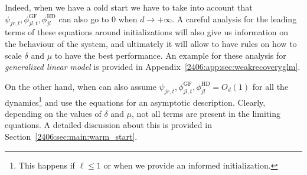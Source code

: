 Indeed, when we have a cold start we have to take into account that \(\psi_{jr,t}, \phi_{jl,t}^\text{GF}, \phi^\text{HD}_{jl}\) can also go to 0 when \(d\to+\infty\). A careful analysis for the leading terms of these equations around initializations will also give us information on the behaviour of the system, and ultimately it will allow to have rules on how to scale \(\delta\) and \(\mu\) to have the best performance. An example for these analysis for \emph{generalized linear model} is provided in Appendix~\ref{2406:app:sec:weakrecoveryglm}.

On the other hand, when can also assume \(\psi_{jr,t}, \phi_{jl,t}^\text{GF}, \phi^\text{HD}_{jl} = O_d(1)\) for all the dynamics\footnote{This happens if \(\ell\le1\) or when we provide an informed initialization.} and use the equations for an asymptotic description. Clearly, depending on the values of \(\delta\) and \(\mu\), not all terms are present in the limiting equations. A detailed discussion about this is provided in Section~\ref{2406:sec:main:warm_start}.

